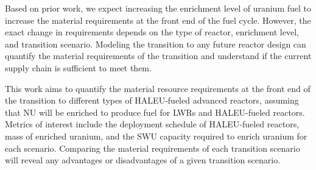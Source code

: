 Based on prior work, we expect increasing the enrichment level of uranium fuel 
to increase the material requirements at the front end of 
the fuel cycle. However, the exact change in requirements depends 
on the type of reactor, enrichment level, and transition scenario.
Modeling the transition to any future
reactor design can quantify the material requirements of the transition
and understand if the current supply chain is sufficient to meet them. 

This work aims to quantify the material resource requirements at the front 
end of the 
transition to different types of \gls{HALEU}-fueled advanced reactors, 
assuming that \gls{NU} will be enriched to produce fuel for \glspl{LWR} and 
\gls{HALEU}-fueled reactors. 
Metrics of interest include the deployment schedule of \gls{HALEU}-fueled 
reactors, mass of enriched uranium, and the \gls{SWU} capacity required to 
enrich uranium for each scenario. Comparing the material requirements of each 
transition scenario will reveal any advantages or disadvantages of 
a given transition scenario. 